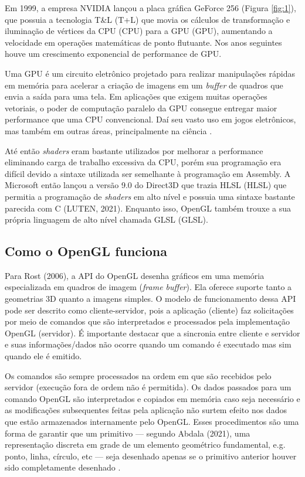 Em 1999, a empresa NVIDIA lançou a placa gráfica GeForce 256 (Figura \ref{fig:1}), que possuia a tecnologia T\&L (\acrlong{T+L}) que movia os cálculos de transformação e iluminação de vértices da CPU (\acrlong{CPU}) para a \acrshort{GPU} (\acrlong{GPU}), aumentando a velocidade em operações matemáticas de ponto flutuante. Nos anos seguintes houve um crescimento exponencial de performance de \acrshort{GPU}.

Uma GPU é um circuito eletrônico projetado para realizar manipulações rápidas em memória para acelerar a criação de imagens em um \textit{buffer} de quadros que envia a saída para uma tela. Em aplicações que exigem muitas operações vetoriais, o poder de computação paralelo da GPU consegue entregar maior performance que uma CPU convencional. Daí seu vasto uso em jogos eletrônicos, mas também em outras áreas, principalmente na ciência \cite{shea2013gpu}.

Até então \textit{shaders} eram bastante utilizados por melhorar a performance eliminando carga de trabalho excessiva da \acrshort{CPU}, porém sua programação era difícil devido a sintaxe utilizada ser semelhante à programação em Assembly. A Microsoft então lançou a versão 9.0 do Direct3D que trazia \acrlong{HLSL} (HLSL) que permitia a programação de \textit{shaders} em alto nível e possuia uma sintaxe bastante parecida com C (LUTEN, 2021)\nocite{openGLBook}. Enquanto isso, OpenGL também trouxe a sua própria linguagem de alto nível chamada \acrlong{GLSL} (GLSL). 

\subsection{Como o OpenGL funciona}
\label{sec:como-opengl-funciona}

Para Rost (2006), a API do OpenGL desenha gráficos em uma memória especializada em quadros de imagem (\textit{frame buffer}). Ela oferece suporte tanto a geometrias 3D quanto a imagens simples. O modelo de funcionamento dessa API pode ser descrito como cliente-servidor, pois a aplicação (cliente) faz solicitações por meio de comandos que são interpretados e processados pela implementação OpenGL (servidor). É importante destacar que a sincronia entre cliente e servidor e suas informações/dados não ocorre quando um comando é executado mas sim quando ele é emitido.

Os comandos são sempre processados na ordem em que são recebidos pelo servidor (execução fora de ordem não é permitida). Os dados passados para um comando OpenGL são interpretados e copiados em memória caso seja necessário e as modificações subsequentes feitas pela aplicação não surtem efeito nos dados que estão armazenados internamente pelo OpenGL. Esses procedimentos são uma forma de garantir que um primitivo --- segundo Abdala (2021)\nocite{abdala}, uma representação discreta em grade de um elemento geométrico fundamental, e.g. ponto, linha, círculo, etc --- seja desenhado apenas se o primitivo anterior houver sido completamente desenhado \cite{GLSLBook}.

